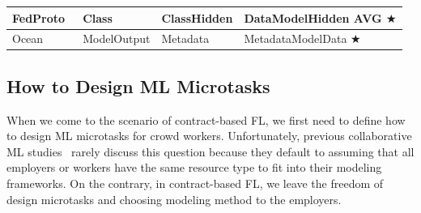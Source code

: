 \begin{table}[t]
\begin{tabular}{|l|p{2.6cm}|p{4cm}|p{5cm}|}
    FedProto~\cite{tan2022fedproto, michieli2021prototype} & \colorbox{Employer!30}{Class} & \colorbox{Employer!30}{Class}\colorbox{Worker!30}{Hidden} & \colorbox{Worker!30}{Data}\colorbox{Worker!30}{Model}\colorbox{Platform!30}{Hidden AVG} $\bigstar$ \\ \hline   

    Ocean~\cite{mcconaghy2022ocean} & \colorbox{Employer!30}{Model}\colorbox{Worker!30}{Output} & \colorbox{Worker!30}{Metadata} & \colorbox{Worker!30}{Metadata}\colorbox{Employer!30}{Model}\colorbox{Worker!30}{Data} $\bigstar$ \\ \hline

    \end{tabular}
\end{table}

\subsection{How to Design ML Microtasks}
\label{sec:how2design}
When we come to the scenario of contract-based FL, we first need to define how to design ML microtasks for crowd workers. 
Unfortunately, previous collaborative ML studies~\cite{li2021survey, nguyen2021federated} rarely discuss this question because they default to assuming that all employers or workers have the same resource type to fit into their modeling frameworks.
On the contrary, in contract-based FL, we leave the freedom of design microtasks and choosing modeling method to the employers.

